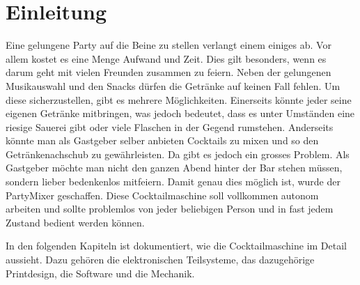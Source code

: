 \clearpage
\section{Einleitung}
\label{sec:Einleitung}

Eine gelungene Party auf die Beine zu stellen verlangt einem einiges ab. Vor allem kostet es eine Menge Aufwand und Zeit. Dies gilt besonders, wenn es darum geht mit vielen Freunden zusammen zu feiern. Neben der gelungenen Musikauswahl und den Snacks dürfen die Getränke auf keinen Fall fehlen. Um diese sicherzustellen, gibt es mehrere Möglichkeiten. Einerseits könnte jeder seine eigenen Getränke mitbringen, was jedoch bedeutet, dass es unter Umständen eine riesige Sauerei gibt oder viele Flaschen in der Gegend rumstehen. Anderseits könnte man als Gastgeber selber anbieten Cocktails zu mixen und so den Getränkenachschub zu gewährleisten. Da gibt es jedoch ein grosses Problem. Als Gastgeber möchte man nicht den ganzen Abend hinter der Bar stehen müssen, sondern lieber bedenkenlos mitfeiern. Damit genau dies möglich ist, wurde der PartyMixer geschaffen. Diese Cocktailmaschine soll vollkommen autonom arbeiten und sollte problemlos von jeder beliebigen Person und in fast jedem Zustand bedient werden können. 

In den folgenden Kapiteln ist dokumentiert, wie die Cocktailmaschine im Detail aussieht. Dazu gehören die elektronischen Teilsysteme, das dazugehörige Printdesign, die Software und die Mechanik.